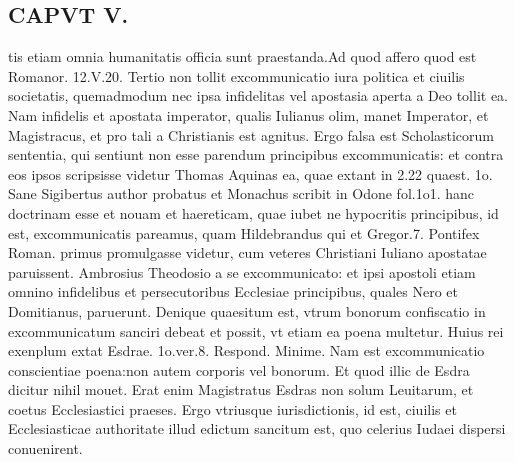 \documentclass{article}
\begin{document}
\begin{pages}
\section*{CAPVT  V. }
\marginpar{[ p.40 ]}\pstart tis etiam omnia humanitatis officia sunt praestanda.Ad quod affero quod est Romanor. 12.V.20. Tertio non tollit excommunicatio iura politica et ciuilis societatis, quemadmodum nec ipsa infidelitas vel apostasia aperta a Deo tollit ea. Nam infidelis et apostata imperator, qualis Iulianus olim, manet Imperator, et Magistracus, et pro tali a Christianis est agnitus. Ergo falsa est Scholasticorum sententia, qui sentiunt non esse parendum principibus excommunicatis: et contra eos ipsos scripsisse videtur Thomas Aquinas ea, quae extant in 2.22 quaest. 1o. Sane Sigibertus author probatus et Monachus scribit in Odone fol.1o1. hanc doctrinam esse et nouam et haereticam, quae iubet ne hypocritis principibus, id est, excommunicatis pareamus, quam Hildebrandus qui et Gregor.7. Pontifex Roman. primus promulgasse videtur, cum veteres Christiani Iuliano apostatae paruissent. Ambrosius Theodosio a se excommunicato: et ipsi apostoli etiam omnino infidelibus et persecutoribus Ecclesiae principibus, quales Nero et Domitianus, paruerunt. Denique quaesitum est, vtrum bonorum confiscatio in excommunicatum sanciri debeat et possit, vt etiam ea poena multetur. Huius rei exenplum extat Esdrae. 1o.ver.8. Respond. Minime. Nam est excommunicatio conscientiae poena:non autem corporis vel bonorum. Et quod illic de Esdra dicitur nihil mouet. Erat enim Magistratus Esdras non solum Leuitarum, et coetus Ecclesiastici praeses. Ergo vtriusque iurisdictionis, id est, ciuilis et Ecclesiasticae authoritate illud edictum sancitum est, quo celerius Iudaei dispersi conuenirent.  \pend

\end{pages}
\end{document}
